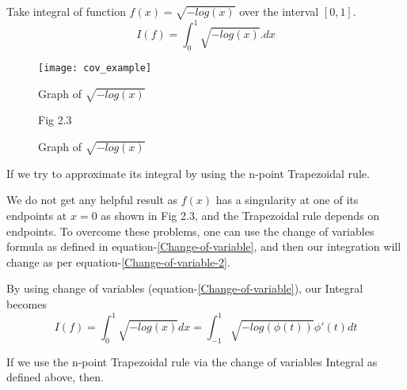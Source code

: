 \documentclass[../document.tex]{subfiles}
\begin{document}
	\begin{examp}
		Take integral of function $f(x) = \sqrt{-log(x)}$ over the interval $[0,1]$.  
		$$
		I(f) = \int_{0}^{1} \sqrt{-log(x)}.dx
		$$
		
		\begin{figure}[h] \label{p2}
			\texttt{[image: cov\_example]}
			\centering	
			\caption{Graph of $ \sqrt{-log(x)}$}		
			\begin{center}
				Graph of $ \sqrt{-log(x)}$
				
				\vspace{1mm}
				
				Fig  2.3
			\end{center}
		\end{figure}
		
		
		If we try to approximate its integral by using the n-point Trapezoidal rule.
		
		We do not get any helpful result as $f(x)$ has a singularity at one of its endpoints at $x=0$ as shown in Fig 2.3, and the Trapezoidal rule depends on endpoints. To overcome these problems, one can use the change of variables formula as defined in equation-\ref{Change-of-variable}, and then our integration will change as per equation-\ref{Change-of-variable-2}.
		
		By using change of variables (equation-\ref{Change-of-variable}), our Integral  becomes
		\begin{equation} \label{ex2}
			I(f) = \int_{0}^{1} \sqrt{-log(x)} dx = 
			\int_{-1}^{1}  \sqrt{-log( \phi(t) ) }  \phi'(t)dt
		\end{equation}
		
		If we use the n-point Trapezoidal rule via the change of variables Integral as defined above, then.
		

\end{examp}
\end{document}
